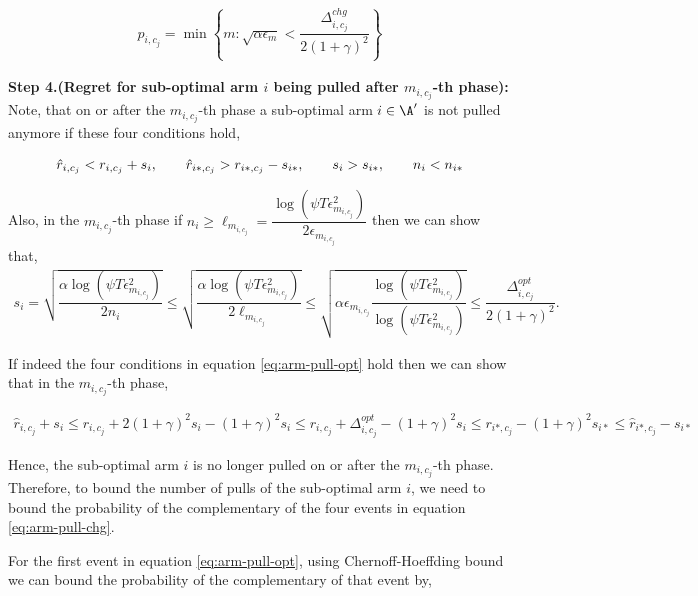 \begin{customproof}{3}
\begin{align*}
p_{i,c_j} = \min\left\lbrace m: \sqrt{\alpha\epsilon_{m}} < \dfrac{\Delta^{chg}_{i,c_j}}{2(1+\gamma)^2} \right\rbrace
\end{align*}

\textbf{Step 4.(Regret for sub-optimal arm $i$ being pulled after $m_{i,c_j}$-th phase):} Note, that on or after the $m_{i,c_j}$-th phase a sub-optimal arm $i\in\A'$ is not pulled anymore if these four conditions hold,

\begin{eqnarray}
\hat{r}_{i,c_j} < r_{i,c_j} + s_i, \hspace*{2em}  \hat{r}_{i*,c_j} > r_{i*,c_j} - s_{i*}, \hspace*{2em} s_i > s_{i*}, \hspace*{2em} n_i < n_{i*} \label{eq:arm-pull-opt}
\end{eqnarray}

Also, in the $m_{i,c_j}$-th phase if $n_i \geq \ell_{m_{i,c_j}} = \dfrac{\log(\psi T\epsilon_{m_{i,c_j}}^2)}{2\epsilon_{m_{i,c_j}}}$ then we can show that,
\begin{align*}
s_i = \sqrt{\dfrac{\alpha\log(\psi T\epsilon_{m_{i,c_j}}^2)}{2n_{i}}} \leq \sqrt{\dfrac{\alpha\log(\psi T\epsilon_{m_{i,c_j}}^2)}{2\ell_{m_{i,c_j}}}} \leq \sqrt{\alpha\epsilon_{m_{i,c_j}}\dfrac{\log(\psi T\epsilon_{m_{i,c_j}}^2)}{\log(\psi T\epsilon_{m_{i,c_j}}^2)}} \leq \dfrac{\Delta^{opt}_{i,c_j}}{2(1+\gamma)^2}.
\end{align*}

If indeed the four conditions in equation \ref{eq:arm-pull-opt} hold then we can show that in the $m_{i,c_j}$-th phase,

\begin{align*}
\hat{r}_{i,c_j} + s_i \leq {r}_{i,c_j} + 2(1+\gamma)^2 s_i - (1+\gamma)^2s_i \leq {r}_{i,c_j} + \Delta^{opt}_{i,c_j} - (1+\gamma)^2s_i \leq {r}_{i*,c_j} - (1+\gamma)^2s_{i*} \leq \hat{r}_{i*,c_j} - s_{i*}
\end{align*}

Hence, the sub-optimal arm $i$ is no longer pulled on or after the $m_{i,c_j}$-th phase. Therefore, to bound the number of pulls of the sub-optimal arm $i$, we need to bound the probability of the complementary of the four events in equation \ref{eq:arm-pull-chg}.

For the first event in equation \ref{eq:arm-pull-opt}, using Chernoff-Hoeffding bound we can bound the probability of the complementary of that event by,


\end{customproof}
